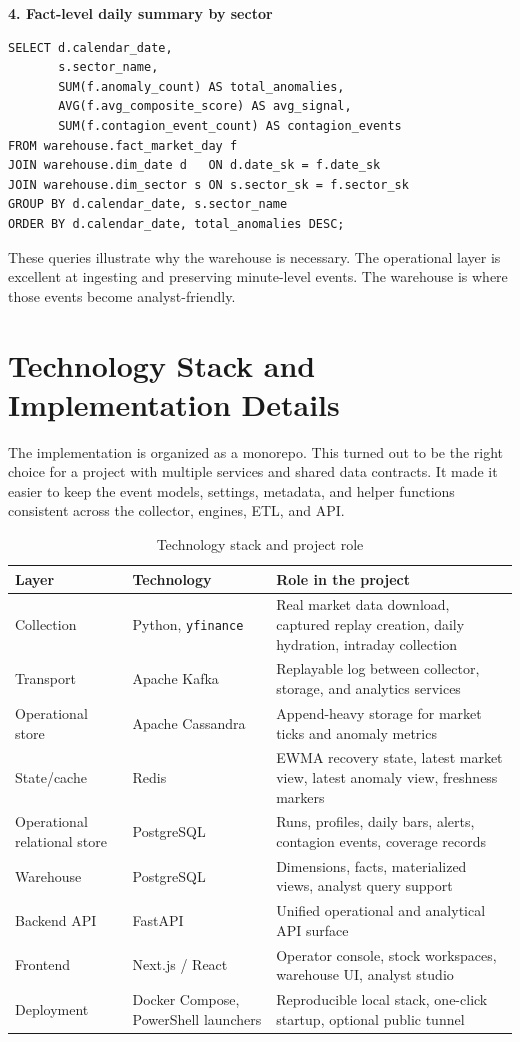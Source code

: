 \documentclass[11pt,a4paper]{article}
\begin{document}
\textbf{4. Fact-level daily summary by sector}
\begin{verbatim}
SELECT d.calendar_date,
       s.sector_name,
       SUM(f.anomaly_count) AS total_anomalies,
       AVG(f.avg_composite_score) AS avg_signal,
       SUM(f.contagion_event_count) AS contagion_events
FROM warehouse.fact_market_day f
JOIN warehouse.dim_date d   ON d.date_sk = f.date_sk
JOIN warehouse.dim_sector s ON s.sector_sk = f.sector_sk
GROUP BY d.calendar_date, s.sector_name
ORDER BY d.calendar_date, total_anomalies DESC;
\end{verbatim}

These queries illustrate why the warehouse is necessary. The operational layer is excellent at ingesting and preserving minute-level events. The warehouse is where those events become analyst-friendly.

\section{Technology Stack and Implementation Details}
The implementation is organized as a monorepo. This turned out to be the right choice for a project with multiple services and shared data contracts. It made it easier to keep the event models, settings, metadata, and helper functions consistent across the collector, engines, ETL, and API.

\begin{table}[H]
\centering
\caption{Technology stack and project role}
\begin{tabularx}{\textwidth}{L{0.2\textwidth}L{0.23\textwidth}Y}
\toprule
\textbf{Layer} & \textbf{Technology} & \textbf{Role in the project} \\
\midrule
Collection & Python, \texttt{yfinance} & Real market data download, captured replay creation, daily hydration, intraday collection \\
Transport & Apache Kafka & Replayable log between collector, storage, and analytics services \\
Operational store & Apache Cassandra & Append-heavy storage for market ticks and anomaly metrics \\
State/cache & Redis & EWMA recovery state, latest market view, latest anomaly view, freshness markers \\
Operational relational store & PostgreSQL & Runs, profiles, daily bars, alerts, contagion events, coverage records \\
Warehouse & PostgreSQL & Dimensions, facts, materialized views, analyst query support \\
Backend API & FastAPI & Unified operational and analytical API surface \\
Frontend & Next.js / React & Operator console, stock workspaces, warehouse UI, analyst studio \\
Deployment & Docker Compose, PowerShell launchers & Reproducible local stack, one-click startup, optional public tunnel \\
\bottomrule
\end{tabularx}
\end{table}
\end{document}
